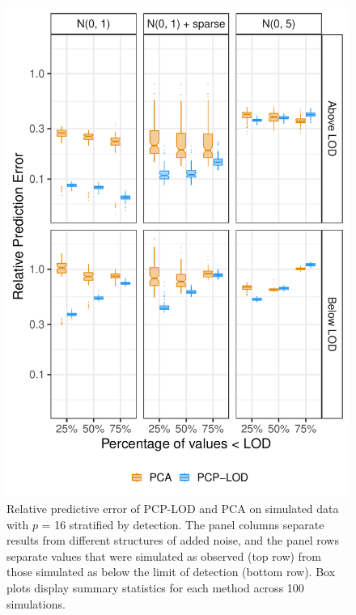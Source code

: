\begin{figure}
    \centering
\includegraphics[width=.75\textwidth]{figures/lod_boxplots_16.pdf}
   \caption{Relative predictive error of PCP-LOD and PCA on simulated data with $p$ = 16 stratified by detection. The panel columns separate results from different structures of added noise, and the panel rows separate values that were simulated as observed (top row) from those simulated as below the limit of detection (bottom row). Box plots display summary statistics for each method across 100 simulations.}
    \label{fig:above_below}
\end{figure}

